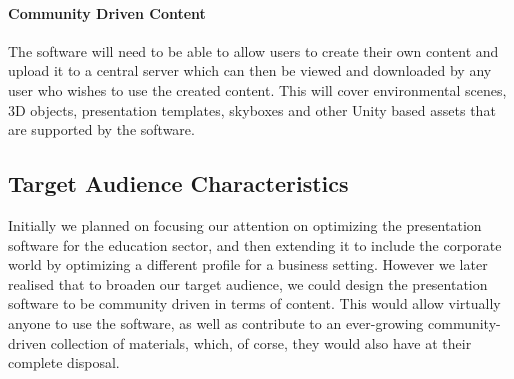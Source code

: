 		\paragraph{Community Driven Content}

		The software will need to be able to allow users to create their own content and upload it to a central server which can then be viewed and downloaded by any user who wishes to use the created content.
		This will cover environmental scenes, 3D objects, presentation templates, skyboxes and other Unity based assets that are supported by the software.

\subsection{Target Audience Characteristics}

	Initially we planned on focusing our attention on optimizing the presentation software for the education sector, and then extending it to include the corporate world by optimizing a different profile for a business setting.  However we later realised that to broaden our target audience, we could design the presentation software to be community driven in terms of content.  This would allow virtually anyone to use the software, as well as contribute to an ever-growing community-driven collection of materials, which, of corse, they would also have at their complete disposal.

